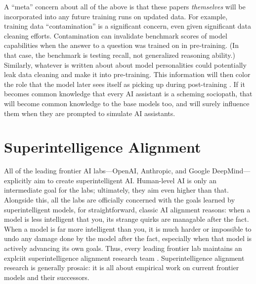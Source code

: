 A ``meta'' concern about all of the above is that these papers
\emph{themselves} will be incorporated into any future training runs on updated
data. For example, training data ``contamination'' is a significant concern,
even given significant data cleaning efforts. Contamination can invalidate
benchmark scores of model capabilities when the answer to a question was
trained on in pre-training. (In that case, the benchmark is testing recall, not
generalized reasoning ability.) Similarly, whatever is written about about
model personalities could potentially leak data cleaning and make it into
pre-training. This information will then color the role that the model later
sees itself as picking up during post-training \cite{nostalgebraist2025void}.
If it becomes common knowledge that every AI assistant is a scheming sociopath,
that will become common knowledge to the base models too, and will surely
influence them when they are prompted to simulate AI assistants.

\section{Superintelligence Alignment}
All of the leading frontier AI labs---OpenAI, Anthropic, and Google
DeepMind---explicitly aim to create superintelligent AI. Human-level AI is only
an intermediate goal for the labs; ultimately, they aim even higher than that.
Alongside this, all the labs are officially concerned with the goals learned by
superintelligent models, for straightforward, classic AI alignment reasons:
when a model is less intelligent that you, its strange quirks are managable
after the fact. When a model is far more intelligent than you, it is much
harder or impossible to undo any damage done by the model after the fact,
especially when that model is actively advancing its own goals. Thus, every
leading frontier lab maintains an explciit superintelligence alignment research
team \cite{leike2023superalignment, anthropic2025rsp}. Superintelligence
alignment research is generally prosaic: it is all about empirical work on
current frontier models and their successors.


